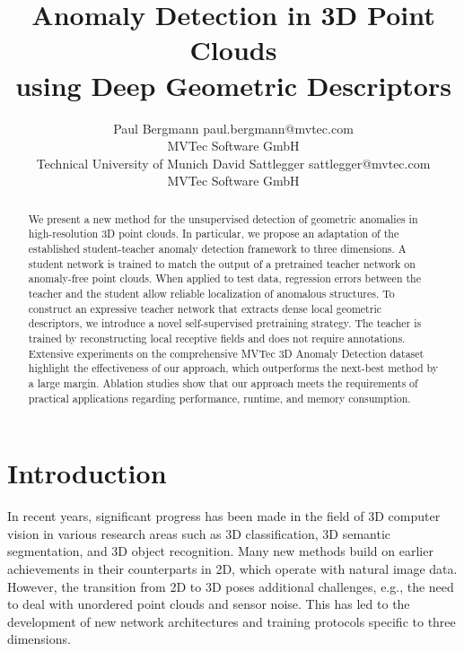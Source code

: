 \documentclass[twoside,11pt]{article}
\begin{document}
\title{Anomaly Detection in 3D Point Clouds \\ using Deep Geometric Descriptors}

\author{\name Paul Bergmann \email paul.bergmann@mvtec.com \\
       \addr MVTec Software GmbH\\
       Technical University of Munich       \AND
       \name David Sattlegger \email sattlegger@mvtec.com \\
       \addr MVTec Software GmbH}

\editor{}

\maketitle

\begin{abstract}We present a new method for the unsupervised detection of geometric anomalies in high-resolution 3D point clouds. In particular, we propose an adaptation of the established student-teacher anomaly detection framework to three dimensions. A student network is trained to match the output of a pretrained teacher network on anomaly-free point clouds. When applied to test data, regression errors between the teacher and the student allow reliable localization of anomalous structures.
To construct an expressive teacher network that extracts dense local geometric descriptors, we introduce a novel self-supervised pretraining strategy. The teacher is trained by reconstructing local receptive fields and does not require annotations. Extensive experiments on the comprehensive MVTec 3D Anomaly Detection dataset highlight the effectiveness of our approach, which outperforms the next-best method by a large margin. Ablation studies show that our approach meets the requirements of practical applications regarding performance, runtime, and memory consumption.
\end{abstract}

\section{Introduction}


In recent years, significant progress has been made in the field of 3D computer vision in various research areas such as 3D classification, 3D semantic segmentation, and 3D object recognition. Many new methods build on earlier achievements in their counterparts in 2D, which operate with natural image data. However, the transition from 2D to 3D poses additional challenges, e.g., the need to deal with unordered point clouds and sensor noise. This has led to the development of new network architectures and training protocols specific to three dimensions.
\end{document}
